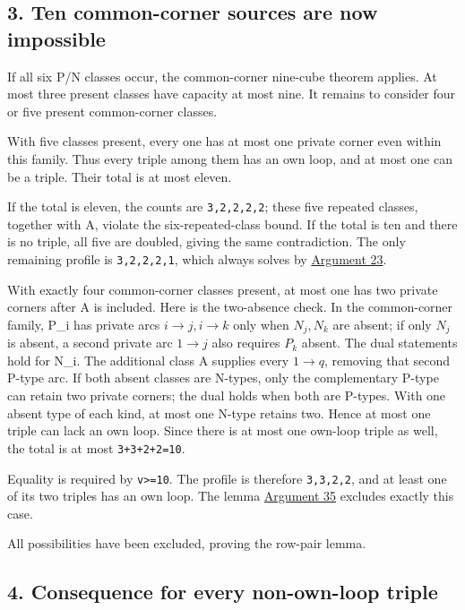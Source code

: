 \documentclass[
  10pt,
]{article}
\begin{document}
\hypertarget{ten-common-corner-sources-are-now-impossible}{%
\subsection*{3. Ten common-corner sources are now
impossible}\label{ten-common-corner-sources-are-now-impossible}}

If all six P/N classes occur, the common-corner nine-cube theorem
applies. At most three present classes have capacity at most nine. It
remains to consider four or five present common-corner classes.

With five classes present, every one has at most one private corner even
within this family. Thus every triple among them has an own loop, and at
most one can be a triple. Their total is at most eleven.

If the total is eleven, the counts are \texttt{3,2,2,2,2}; these five
repeated classes, together with A, violate the six-repeated-class bound.
If the total is ten and there is no triple, all five are doubled, giving
the same contradiction. The only remaining profile is
\texttt{3,2,2,2,1}, which always solves by
\protect\hyperlink{arg-23}{Argument 23}.

With exactly four common-corner classes present, at most one has two
private corners after A is included. Here is the two-absence check. In
the common-corner family, P\_i has private arcs \(i\to j,i\to k\) only
when \(N_j,N_k\) are absent; if only \(N_j\) is absent, a second private
arc \(1\to j\) also requires \(P_k\) absent. The dual statements hold
for N\_i. The additional class A supplies every \(1\to q\), removing
that second P-type arc. If both absent classes are N-types, only the
complementary P-type can retain two private corners; the dual holds when
both are P-types. With one absent type of each kind, at most one N-type
retains two. Hence at most one triple can lack an own loop. Since there
is at most one own-loop triple as well, the total is at most
\texttt{3+3+2+2=10}.

Equality is required by \texttt{v\textgreater{}=10}. The profile is
therefore \texttt{3,3,2,2}, and at least one of its two triples has an
own loop. The lemma \protect\hyperlink{arg-35}{Argument 35} excludes
exactly this case.

All possibilities have been excluded, proving the row-pair lemma.

\hypertarget{consequence-for-every-non-own-loop-triple}{%
\subsection*{4. Consequence for every non-own-loop
triple}\label{consequence-for-every-non-own-loop-triple}}
\end{document}
